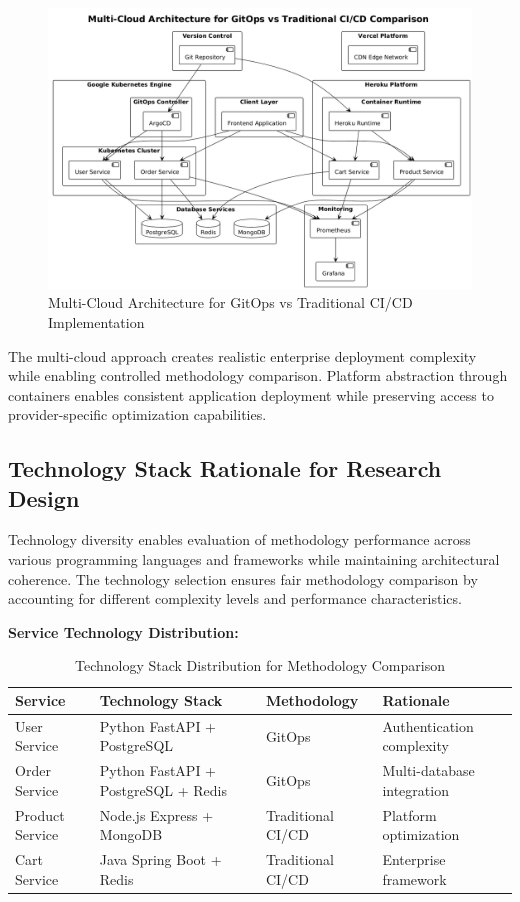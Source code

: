 \begin{figure}[H]
\centering
\includegraphics[width=1.0\textwidth]{figures/Multi-Cloud-Architecture-Diagram.png}
\caption{Multi-Cloud Architecture for GitOps vs Traditional CI/CD Implementation}
\label{fig:multi-cloud-architecture}
\end{figure}


The multi-cloud approach creates realistic enterprise deployment complexity while enabling controlled methodology comparison. Platform abstraction through containers enables consistent application deployment while preserving access to provider-specific optimization capabilities.

\subsection{Technology Stack Rationale for Research Design}

Technology diversity enables evaluation of methodology performance across various programming languages and frameworks while maintaining architectural coherence. The technology selection ensures fair methodology comparison by accounting for different complexity levels and performance characteristics.

\textbf{Service Technology Distribution:}

\begin{table}[h]
\centering
\caption{Technology Stack Distribution for Methodology Comparison}
\label{tab:tech_stack_distribution}
\renewcommand{\arraystretch}{1.2}
\small
\begin{tabular}{|p{2.3cm}|p{4.2cm}|p{2.4cm}|p{3.5cm}|}
\hline
\textbf{Service} & \textbf{Technology Stack} & \textbf{Methodology} & \textbf{Rationale} \\
\hline
User Service & Python FastAPI + PostgreSQL & GitOps & Authentication complexity \\
\hline
Order Service & Python FastAPI + PostgreSQL + Redis & GitOps & Multi-database integration \\
\hline
Product Service & Node.js Express + MongoDB & Traditional CI/CD & Platform optimization \\
\hline
Cart Service & Java Spring Boot + Redis & Traditional CI/CD & Enterprise framework \\
\hline
\end{tabular}
\end{table}

